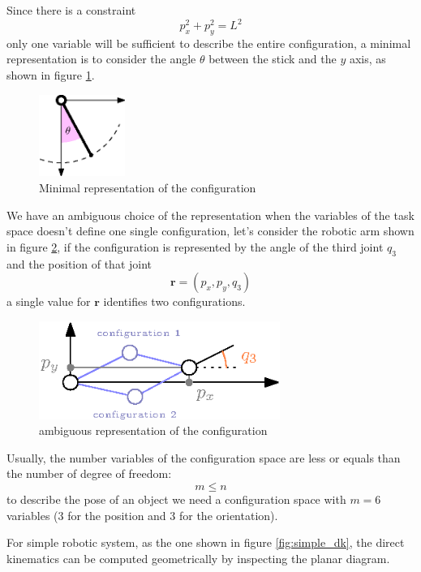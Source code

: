 \documentclass[10pt, letterpaper]{report}
\begin{document}
Since there is a constraint \begin{equation}
    p_x^2+p_y^2=L^2 
\end{equation}
only one variable will be sufficient to describe the entire configuration, a minimal representation is to consider the angle $\theta$ between the stick and the $y$ axis, as shown in figure \ref{fig:pendulum2}.\bigskip

\begin{figure}[h!]
    \centering
    \includegraphics[width=0.25\textwidth ]{images/pendulum2.eps}
    \caption{Minimal representation of the configuration}
    \label{fig:pendulum2}
\end{figure}

We have an ambiguous choice of the representation when the variables of the task space doesn't define one single configuration, let's consider the robotic arm shown in figure \ref{fig:ambogous}, if the configuration is represented by the angle of the third joint $q_3$ and the position of that joint
$$
\mathbf r=(p_x,p_y,q_3)
$$a single value for $\mathbf r$ identifies two configurations. \bigskip 

\begin{figure}[h!]
    \centering
    \includegraphics[width=0.7\textwidth ]{images/ambigous.eps}
    \caption{ambiguous representation of the configuration}
    \label{fig:ambogous}
\end{figure}

Usually, the number variables of the configuration space are less or equals than the number of degree of freedom:$$ m\le n$$
to describe the pose of an object we need a configuration space with $m=6$ variables (3 for the position and 3 for the orientation). \bigskip 

For simple robotic system, as the one shown in figure \ref{fig:simple_dk}, the direct kinematics can be computed geometrically by inspecting the planar diagram.
\end{document}
